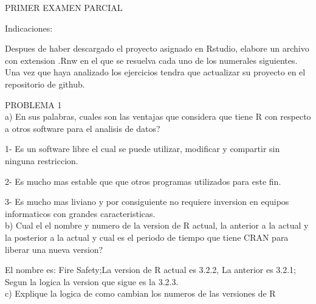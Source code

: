\documentclass{article}
\begin{document}

PRIMER EXAMEN PARCIAL

Indicaciones:

Despues de haber descargado el proyecto asignado en Rstudio, elabore un archivo con extension  .Rnw en el que se resuelva cada uno de los numerales siguientes. Una vez que haya analizado los ejercicios tendra que actualizar su proyecto en el repositorio de github.

PROBLEMA 1
\\

a) En sus palabras, cuales son las ventajas que considera que tiene R con respecto a otros software para el analisis de datos?

1- Es un software libre el cual se puede utilizar, modificar y compartir sin ninguna restriccion.

2- Es mucho mas estable que que otros programas utilizados para este fin.

3- Es mucho mas liviano y por consiguiente no requiere inversion en equipos informaticos con grandes caracteristicas.
\\

b) Cual el el nombre y numero de la version de R actual, la anterior a la actual y la posterior a la actual y cual es el periodo de tiempo que tiene CRAN para liberar una nueva version?

El nombre es: Fire Safety;La version de R actual es 3.2.2, La anterior es 3.2.1; Segun la logica la version que sigue es la 3.2.3.
\\

c) Explique la logica de como cambian los numeros de las versiones de R
\end{document}
